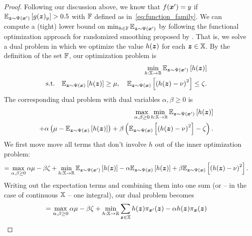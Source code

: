 \begin{proof}
Following our discussion above, we know that $f({\bm{x}}') = y$ if $\mathbb{E}_{{\bm{z}} \sim \Psi({\bm{x}}')}
\left[g({\bm{z}})_y\right] > 0.5$ with ${\mathbb{F}}$ defined as in~\autoref{eq:function_family}.
We can compute a (tight) lower bound on $\min_{h \in {\mathbb{F}}} 
\mathbb{E}_{{\bm{z}} \sim \Psi({\bm{x}}')}$ by following the functional optimization approach for randomized smoothing proposed by \citet{Zhang2020}. That is, we solve a dual problem in which we optimize the value $h({\bm{z}})$ for each ${\bm{z}} \in {\mathbb{X}}$.
By the definition of the set ${\mathbb{F}}$, our optimization problem is
\begin{align}
     \min_{h : {\mathbb{X}} \rightarrow {\mathbb{R}}} \mathbb{E}_{{\bm{z}} \sim \Psi({\bm{x}}')} \left[h({\bm{z}})\right]\\
    \text{s.t.} \quad
    \mathbb{E}_{{\bm{z}} \sim \Psi({\bm{x}})}\left[h({\bm{z}})\right] \geq \mu, \quad
            \mathbb{E}_{{\bm{z}} \sim \Psi({\bm{x}})}\left[\left(h({\bm{z}}) - \nu \right)^2\right] \leq \zeta.
\end{align}
The corresponding dual problem with dual variables $\alpha, \beta \geq 0$ is
\begin{equation}
\begin{split}
    \max_{\alpha,\beta \geq 0} \min_{h : {\mathbb{X}} \rightarrow {\mathbb{R}}}
    \mathbb{E}_{{\bm{z}} \sim \Psi({\bm{x}}')} \left[h({\bm{z}})\right] \\ 
    + \alpha \left( \mu - \mathbb{E}_{{\bm{z}} \sim \Psi({\bm{x}})} \left[h({\bm{z}})\right] \right)
    + \beta \left(  \mathbb{E}_{{\bm{z}} \sim \Psi({\bm{x}})}\left[\left(h({\bm{z}}) - \nu \right)^2\right] - \zeta \right).
\end{split}
\end{equation}
We first move move all terms that don't involve $h$ out of the inner optimization problem:
\begin{equation}
    = \max_{\alpha,\beta \geq 0} \alpha \mu - \beta \zeta
    +
    \min_{h : {\mathbb{X}} \rightarrow {\mathbb{R}}}
    \mathbb{E}_{{\bm{z}} \sim \Psi({\bm{x}}')} \left[h({\bm{z}})\right]
    - \alpha \mathbb{E}_{{\bm{z}} \sim \Psi({\bm{x}})}  \left[h({\bm{z}})\right]
    + \beta \mathbb{E}_{{\bm{z}} \sim \Psi({\bm{x}})}\left[\left(h({\bm{z}}) - \nu \right)^2\right].
\end{equation}
Writing out the expectation terms and combining them into one sum (or -- in the case of continuous ${\mathbb{X}}$ -- one integral), our dual problem becomes 
\begin{equation}\label{eq:theorem_first_eq}
    = \max_{\alpha,\beta \geq 0} \alpha \mu - \beta \zeta
    +
    \min_{h : \sX \rightarrow \sR}
    \sum_{\vz \in \sX}
    h(\vz) \pi_{\vx'}(\vz)
    -
    \alpha h(\vz) \pi_{\vx}(\vz)

\end{equation}
\end{proof}
